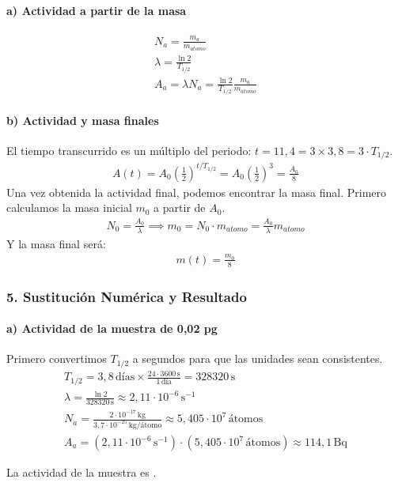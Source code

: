 \paragraph*{a) Actividad a partir de la masa}
\begin{gather}
    N_a = \frac{m_a}{m_{atomo}} \\
    \lambda = \frac{\ln 2}{T_{1/2}} \\
    A_a = \lambda N_a = \frac{\ln 2}{T_{1/2}} \frac{m_a}{m_{atomo}}
\end{gather}
\paragraph*{b) Actividad y masa finales}
El tiempo transcurrido es un múltiplo del periodo: $t = 11,4 = 3 \times 3,8 = 3 \cdot T_{1/2}$.
\begin{gather}
    A(t) = A_0 \left(\frac{1}{2}\right)^{t/T_{1/2}} = A_0 \left(\frac{1}{2}\right)^3 = \frac{A_0}{8}
\end{gather}
Una vez obtenida la actividad final, podemos encontrar la masa final. Primero calculamos la masa inicial $m_0$ a partir de $A_0$.
\begin{gather}
    N_0 = \frac{A_0}{\lambda} \implies m_0 = N_0 \cdot m_{atomo} = \frac{A_0}{\lambda} m_{atomo}
\end{gather}
Y la masa final será:
\begin{gather}
    m(t) = \frac{m_0}{8}
\end{gather}

\subsubsection*{5. Sustitución Numérica y Resultado}
\paragraph*{a) Actividad de la muestra de 0,02 pg}
Primero convertimos $T_{1/2}$ a segundos para que las unidades sean consistentes.
\begin{gather}
    T_{1/2} = 3,8 \, \text{días} \times \frac{24 \cdot 3600 \, \text{s}}{1 \, \text{día}} = 328320 \, \text{s} \\
    \lambda = \frac{\ln 2}{328320 \, \text{s}} \approx 2,11 \cdot 10^{-6} \, \text{s}^{-1} \\
    N_a = \frac{2 \cdot 10^{-17} \, \text{kg}}{3,7 \cdot 10^{-25} \, \text{kg/átomo}} \approx 5,405 \cdot 10^7 \, \text{átomos} \\
    A_a = (2,11 \cdot 10^{-6} \, \text{s}^{-1}) \cdot (5,405 \cdot 10^7 \, \text{átomos}) \approx 114,1 \, \text{Bq}
\end{gather}
\begin{cajaresultado}
    La actividad de la muestra es .
\end{cajaresultado}
